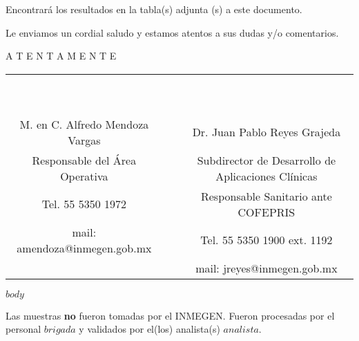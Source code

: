 \documentclass[$if(fontsize)$$fontsize$,$endif$$if(papersize)$$papersize$,$endif$$for(classoption)$$classoption$$sep$,$endfor$table]{article}
\begin{document}
\medskip

Encontrará los resultados en la tabla(s) adjunta (s) a este documento.\\

\smallskip

Le enviamos un cordial saludo y estamos atentos a sus dudas y/o comentarios.\\

\medskip

\vspace*{\fill}
\begin{center}
A T E N T A M E N T E
\end{center}
\vspace{2cm}
\begin{tabular}{c p{2cm} c}
~ & ~ & ~ \\
~ & ~ & ~ \\
\cmidrule(r){1-1}\cmidrule(l){3-3}
M. en C. Alfredo Mendoza Vargas & ~ & Dr. Juan Pablo Reyes Grajeda \\
Responsable del Área Operativa & ~ & Subdirector de Desarrollo de Aplicaciones Clínicas\\
Tel. 55 5350 1972 & ~ & Responsable Sanitario ante COFEPRIS\\
mail: amendoza@inmegen.gob.mx & ~ & Tel. 55 5350 1900 ext. 1192\\
~ & ~ & mail: jreyes@inmegen.gob.mx \\
\end{tabular}

\newpage

$body$


\vspace*{\fill}
Las muestras \textbf{no} fueron tomadas por el INMEGEN. Fueron procesadas por el personal $brigada$ y validados por el(los) analista(s) $analista$.
\end{document}
